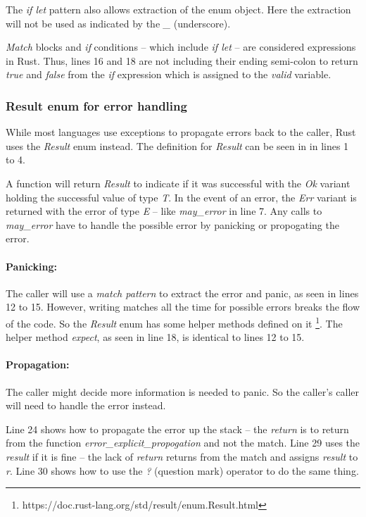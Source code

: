 The \textit{if let} pattern also allows extraction of the enum object.
Here the extraction will not be used as indicated by the \textit{\_} (underscore).

\textit{Match} blocks and \textit{if} conditions -- which include \textit{if let} -- are considered expressions in Rust.
Thus, lines 16 and 18 are not including their ending semi-colon to return \textit{true} and \textit{false} from the \textit{if} expression which is assigned to the \textit{valid} variable.

\subsubsection{Result enum for error handling}
\label{sec:result-enum}
While most languages use exceptions to propagate errors back to the caller, Rust uses the \textit{Result} enum instead.
The definition for \textit{Result} can be seen in  in lines 1 to 4.


A function will return \textit{Result} to indicate if it was successful with the \textit{Ok} variant holding the successful value of type \textit{T}.
In the event of an error, the \textit{Err} variant is returned with the error of type \textit{E} -- like \textit{may\_error} in line 7.
Any calls to \textit{may\_error} have to handle the possible error by panicking or propogating the error.

\paragraph{Panicking:}
The caller will use a \textit{match pattern} to extract the error and panic, as seen in lines 12 to 15.
However, writing matches all the time for possible errors breaks the flow of the code.
So the \textit{Result} enum has some helper methods defined on it \footnote{https://doc.rust-lang.org/std/result/enum.Result.html}.
The helper method \textit{expect}, as seen in line 18, is identical to lines 12 to 15.

\paragraph{Propagation:}
The caller might decide more information is needed to panic.
So the caller's caller will need to handle the error instead.

Line 24 shows how to propagate the error up the stack -- the \textit{return} is to return from the function \textit{error\_explicit\_propogation} and not the match.
Line 29 uses the \textit{result} if it is fine -- the lack of \textit{return} returns from the match and assigns \textit{result} to \textit{r}.
Line 30 shows how to use the \textit{?} (question mark) operator to do the same thing.



